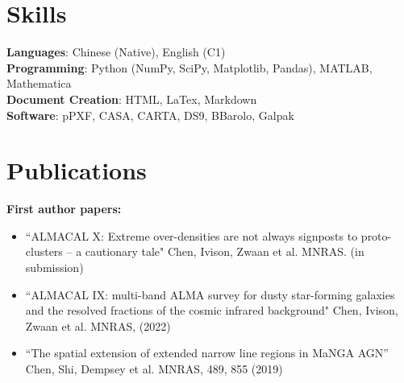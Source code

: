 \documentclass[A4,11pt]{article}
\newenvironment{paperlist}
{ \begin{itemize}[leftmargin=0.8cm, label={$\bullet$}]
    \setlength{\itemsep}{1pt}
    \setlength{\parskip}{1pt}
    \setlength{\parsep}{1pt}     }
{ \end{itemize}                  }
\begin{document}

\section{Skills}
 \begin{itemize}[leftmargin=0.5cm, label={}]
    \small{\item{
     \textbf{Languages}{: Chinese (Native), English (C1)} \\
     \textbf{Programming}{: Python (NumPy, SciPy, Matplotlib, Pandas), MATLAB, Mathematica} \\
     \textbf{Document Creation}{: HTML, LaTex, Markdown} \\
     \textbf{Software}{: pPXF, CASA, CARTA, DS9, BBarolo, Galpak}
    }}
 \end{itemize}


\section{Publications}
{\bf First author papers:}\\
\vspace{-0.8em}
\begin{paperlist}
    \item ``ALMACAL X: Extreme over-densities are not always signposts to proto-clusters -- a cautionary tale" Chen, Ivison, Zwaan et al. MNRAS. (in submission)
    \item ``ALMACAL IX: multi-band ALMA survey for dusty star-forming galaxies and the resolved fractions of the cosmic infrared background" Chen, Ivison, Zwaan et al. MNRAS, (2022)
    \item ``The spatial extension of extended narrow line regions in MaNGA AGN” Chen, Shi, Dempsey et al. MNRAS, 489, 855 (2019)
\end{paperlist}
\end{document}
